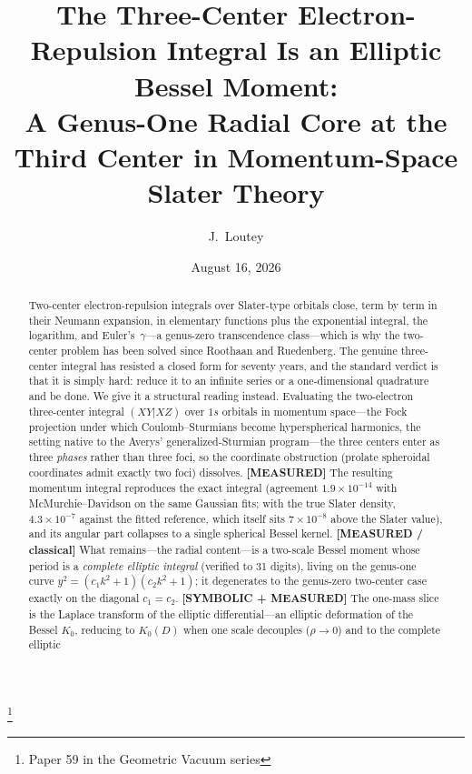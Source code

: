 \documentclass[aps,pra,twocolumn,superscriptaddress,longbibliography]{revtex4-2}
\begin{document}
\title{The Three-Center Electron-Repulsion Integral Is an Elliptic
Bessel Moment:\\
A Genus-One Radial Core at the Third Center in Momentum-Space Slater Theory}
\thanks{Paper 59 in the Geometric Vacuum series}

\author{J.~Loutey}

\date{August 16, 2026}


\begin{abstract}
Two-center electron-repulsion integrals over Slater-type orbitals close,
term by term in their Neumann expansion,
in elementary functions plus the exponential integral, the logarithm, and
Euler's~$\gamma$---a genus-zero transcendence class---which is why the
two-center problem has been solved since Roothaan and Ruedenberg.  The
genuine three-center integral has resisted a closed form for seventy years,
and the standard verdict is that it is simply hard: reduce it to an infinite
series or a one-dimensional quadrature and be done.  We give it a structural
reading instead.  Evaluating the two-electron three-center integral
$(XY|XZ)$ over $1s$ orbitals in momentum space---the Fock projection under
which Coulomb--Sturmians become hyperspherical harmonics, the setting native
to the Averys' generalized-Sturmian program---the three centers enter as
three \emph{phases} rather than three foci, so the coordinate obstruction
(prolate spheroidal coordinates admit exactly two foci) dissolves.
\textbf{[MEASURED]} The resulting momentum integral reproduces the exact
integral (agreement $1.9\times10^{-14}$ with McMurchie--Davidson on the same
Gaussian fits; with the true Slater density, $4.3\times10^{-7}$ against the
fitted reference, which itself sits $7\times10^{-8}$ above the Slater value), and
its angular part collapses to a single spherical Bessel kernel.
\textbf{[MEASURED / classical]} What remains---the radial content---is a
two-scale Bessel moment whose period is a \emph{complete elliptic integral}
(verified to 31 digits), living on the genus-one curve
$y^{2}=(c_{1}k^{2}+1)(c_{2}k^{2}+1)$; it degenerates to the genus-zero
two-center case exactly on the diagonal $c_{1}=c_{2}$.  \textbf{[SYMBOLIC +
MEASURED]} The one-mass slice is the Laplace transform of the elliptic
differential---an elliptic deformation of the Bessel $K_{0}$, reducing to
$K_{0}(D)$ when one scale decouples ($\rho\to0$) and to the complete elliptic

\end{abstract}
\end{document}
